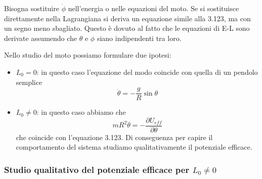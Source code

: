 \begin{remark}
	Bisogna sostituire $\dot{\phi}$ nell'energia o nelle equazioni del moto. Se si sostituisce direttamente nella Lagrangiana si deriva un equazione simile alla 3.123, ma con un segno meno sbagliato. Questo \`{e} dovuto al fatto che le equazioni di E-L sono derivate assumendo che $\theta$ e $\phi$ siano indipendenti tra loro.
\end{remark}
\noindent Nello studio del moto possiamo formulare due ipotesi:
\begin{itemize}
	\item $L_0 = 0 $: in questo caso l'equazione del modo coincide con quella di un pendolo semplice 
 \begin{equation*}
\ddot{\theta}= - \frac{g}{R}  \sin \theta
\end{equation*}
\item $L_0 \neq 0$: in questo caso abbiamo che 
\begin{equation*}
	mR^2 \ddot{\theta} = - \frac{\partial U_{eff}}{\partial \theta}
\end{equation*}
che coincide con l'equazione 3.123. Di conseguenza per capire il comportamento del sistema studiamo qualitativamente il potenziale efficace.
\end{itemize}

\subsubsection{Studio qualitativo del potenziale efficace per $L_0 \neq 0$}

